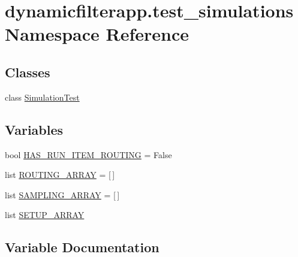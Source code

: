 \hypertarget{namespacedynamicfilterapp_1_1test__simulations}{}\section{dynamicfilterapp.\+test\+\_\+simulations Namespace Reference}
\label{namespacedynamicfilterapp_1_1test__simulations}
\subsection*{Classes}
\begin{DoxyCompactItemize}
\item 
class \mbox{\hyperlink{classdynamicfilterapp_1_1test__simulations_1_1_simulation_test}{Simulation\+Test}}
\end{DoxyCompactItemize}
\subsection*{Variables}
\begin{DoxyCompactItemize}
\item 
bool \mbox{\hyperlink{namespacedynamicfilterapp_1_1test__simulations_a0ed90967f9651d5b20bd15ad5238c5a2}{H\+A\+S\+\_\+\+R\+U\+N\+\_\+\+I\+T\+E\+M\+\_\+\+R\+O\+U\+T\+I\+NG}} = False
\item 
list \mbox{\hyperlink{namespacedynamicfilterapp_1_1test__simulations_a64e6195c8f341cc04542e1008988d1fd}{R\+O\+U\+T\+I\+N\+G\+\_\+\+A\+R\+R\+AY}} = \mbox{[}$\,$\mbox{]}
\item 
list \mbox{\hyperlink{namespacedynamicfilterapp_1_1test__simulations_af59ca891e478dcc8a04e8f4caf690e8c}{S\+A\+M\+P\+L\+I\+N\+G\+\_\+\+A\+R\+R\+AY}} = \mbox{[}$\,$\mbox{]}
\item 
list \mbox{\hyperlink{namespacedynamicfilterapp_1_1test__simulations_aa4c6622e6cd276664a1a67c43db0673f}{S\+E\+T\+U\+P\+\_\+\+A\+R\+R\+AY}}
\end{DoxyCompactItemize}


\subsection{Variable Documentation}
\mbox{\label{namespacedynamicfilterapp_1_1test__simulations_a0ed90967f9651d5b20bd15ad5238c5a2}} 
